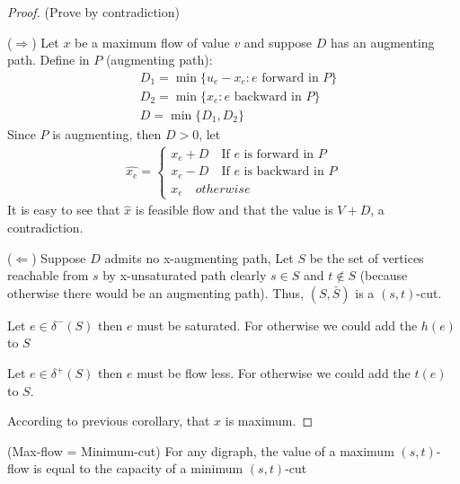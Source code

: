                 \begin{proof}
                    (Prove by contradiction) 

                    ($\Rightarrow$) Let $x$ be a maximum flow of value $v$ and suppose $D$ has an augmenting path. Define in $P$ (augmenting path):
                    \begin{align*}
                        & D_1 = \min \{u_e-x_e: e \text{ forward in } P\} \\
                        & D_2 = \min \{x_e: e \text{ backward in } P\}\\
                        & D = \min \{D_1, D_2\}
                    \end{align*}
                    Since $P$ is augmenting, then $D > 0$, let
                    \begin{align*}
                        \hat{x_e} = \begin{cases}
                            x_e + D \quad \text{If $e$ is forward in $P$}\\
                            x_e - D \quad \text{If $e$ is backward in $P$}\\
                            x_e \quad otherwise
                        \end{cases}
                    \end{align*}
                    It is easy to see that $\hat{x}$ is feasible flow and that the value is $V+D$, a contradiction.

                    ($\Leftarrow$) Suppose $D$ admits no x-augmenting path, Let $S$ be the set of vertices reachable from $s$ by x-unsaturated path clearly $s\in S$ and $t\notin S$ (because otherwise there would be an augmenting path). Thus, $(S, \bar{S})$ is a $(s, t)$-cut.

                    Let $e\in \delta^-(S)$ then $e$ must be saturated. For otherwise we could add the $h(e)$ to $S$

                    Let $e\in \delta^+(S)$ then $e$ must be flow less. For otherwise we could add the $t(e)$ to $S$.

                    According to previous corollary, that $x$ is maximum.
                \end{proof}

                \begin{theorem}(Max-flow = Minimum-cut)
                    For any digraph, the value of a maximum $(s, t)$-flow is equal to the capacity of a minimum $(s, t)$-cut
                \end{theorem}

